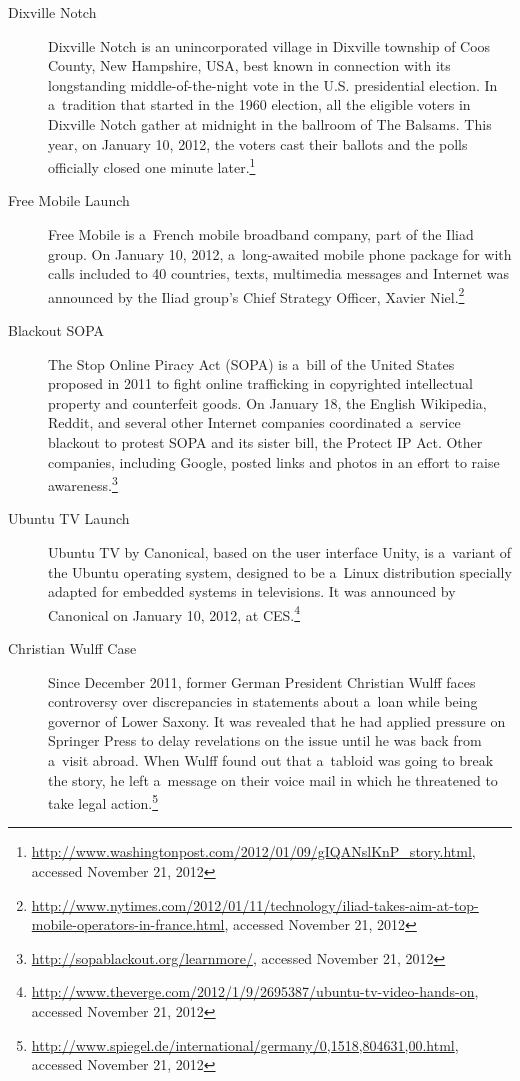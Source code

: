 \begin{description}
  \item[Dixville Notch]
       Dixville Notch is an unincorporated village in Dixville
       township of Coos County, New Hampshire, USA, best known in
       connection with its longstanding middle-of-the-night vote in
       the U.S. presidential election. In a~tradition that started
       in the 1960 election, all the eligible voters in Dixville
       Notch gather at midnight in the ballroom of The Balsams.
       This year, on January 10, 2012, the voters cast their
       ballots and the polls officially closed one minute
       later.\footnote{\url{http://www.washingtonpost.com/2012/01/09/gIQANslKnP_story.html},
       accessed November 21, 2012}
  \item[Free Mobile Launch]
       Free Mobile is a~French mobile broadband company, part of
       the Iliad group. On January 10, 2012, a~long-awaited mobile
       phone package for  with calls included to 40
       countries, texts, multimedia messages and Internet was
       announced by the Iliad group's Chief Strategy Officer,
       Xavier
       Niel.\footnote{\url{http://www.nytimes.com/2012/01/11/technology/iliad-takes-aim-at-top-mobile-operators-in-france.html},
       accessed November 21, 2012}
  \item[Blackout SOPA]
       The Stop Online Piracy Act (SOPA) is a~bill of the United
       States proposed in 2011 to fight online trafficking in
       copyrighted intellectual property and counterfeit goods.
       On January 18, the English Wikipedia, Reddit, and several
       other Internet companies coordinated a~service blackout
       to protest SOPA and its sister bill, the Protect IP Act.
       Other companies, including Google, posted links and
       photos in an effort to raise
       awareness.\footnote{\url{http://sopablackout.org/learnmore/},
       accessed November 21, 2012}
  \item[Ubuntu TV Launch]
       Ubuntu TV by Canonical, based on the user interface Unity,
       is a~variant of the Ubuntu operating system, designed to be
       a~Linux distribution specially adapted for embedded systems
       in televisions. It was announced by Canonical on January
       10, 2012, at
       CES.\footnote{\url{http://www.theverge.com/2012/1/9/2695387/ubuntu-tv-video-hands-on},
       accessed November 21, 2012}
  \item[Christian Wulff Case]
       Since December 2011, former German President Christian
       Wulff faces controversy over discrepancies in statements
       about a~loan while being governor of Lower Saxony.
       It was revealed that he had applied pressure
       on Springer Press to delay revelations on the issue until
       he was back from a~visit abroad. When Wulff found out that
       a~tabloid was going to break the story, he left a~message
       on their voice mail in which he threatened to take legal
       action.\footnote{\url{http://www.spiegel.de/international/germany/0,1518,804631,00.html},
       accessed November 21, 2012}
\end{description}


